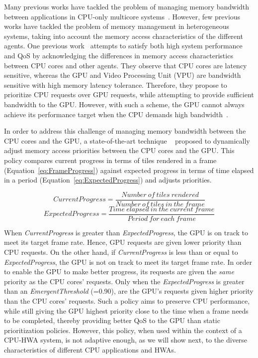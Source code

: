 \documentclass[10pt,letterpaper]{article}
\newcommand{\TMP}[1]{#1}
\begin{document}
Many previous works have tackled the problem of managing memory
bandwidth between applications in CPU-only multicore
systems~\cite{frfcfs,stfm,parbs,fqm,atlas,tcm,mise}. However, few previous works
have tackled the problem of memory management in heterogeneous systems, taking
into account the memory access characteristics of the different agents. One
previous work~\cite{armwhite} attempts to satisfy both high system performance
and QoS by acknowledging the differences in memory access characteristics
between CPU cores and other agents. They observe that CPU cores are latency
\TMP{sensitive, whereas the GPU and Video Processing Unit (VPU) are bandwidth
sensitive with high memory latency tolerance. Therefore, they propose to
prioritize CPU requests over GPU requests, while attempting to provide sufficient bandwidth to the GPU. }
However, with such a scheme, the GPU cannot
always achieve its performance target when the CPU demands high
bandwidth~\cite{schedulingCPUGPU}. 



In order to address this challenge of managing memory bandwidth
between the CPU cores and the GPU, a state-of-the-art technique
~\cite{schedulingCPUGPU} proposed to dynamically adjust memory
access priorities between the CPU cores and the GPU. This policy
compares current progress in terms of tiles rendered in a
frame (Equation~\ref{eq:FrameProgress}) against expected progress
in terms of time elapsed in a period
(Equation~\ref{eq:ExpectedProgress}) and adjusts priorities.

\begin{small}
  \begin{equation}
    CurrentProgress = \frac{Number\ of\ tiles\ rendered}{Number\ of\ tiles\ in\ the\ frame}
    \label{eq:FrameProgress}
  \end{equation}
  \begin{equation}
    ExpectedProgress = \frac{Time\ elapsed\ in\ the\ current\ frame}{Period\ for\ each\ frame}
    \label{eq:ExpectedProgress}
  \end{equation}
\end{small}

When {\it CurrentProgress} is greater than {\it ExpectedProgress}, the GPU is on
track to meet its target frame rate. Hence, GPU requests are given lower priority than
CPU requests. On the other hand, if {\it CurrentProgress} is less than or equal to
{\it ExpectedProgress}, the GPU is not on track to meet its target frame rate.
\TMP{In order to enable the GPU to make better progress, its requests are given the
{\it same} priority as the CPU cores' requests. Only when the {\it
ExpectedProgress} is greater than an {\it EmergentThreshold} (=0.90), are the GPU's
requests given higher priority than the CPU cores' requests.}
Such a policy
aims to preserve CPU performance, while still giving the GPU highest priority
\TMP{close to the time when a frame needs to be completed,}
thereby providing better
QoS to the GPU than static prioritization policies. However, this policy, when
used within the context of a CPU-HWA system, is not adaptive enough, as we will
show next, to the diverse characteristics of different CPU applications and
HWAs.
\end{document}
